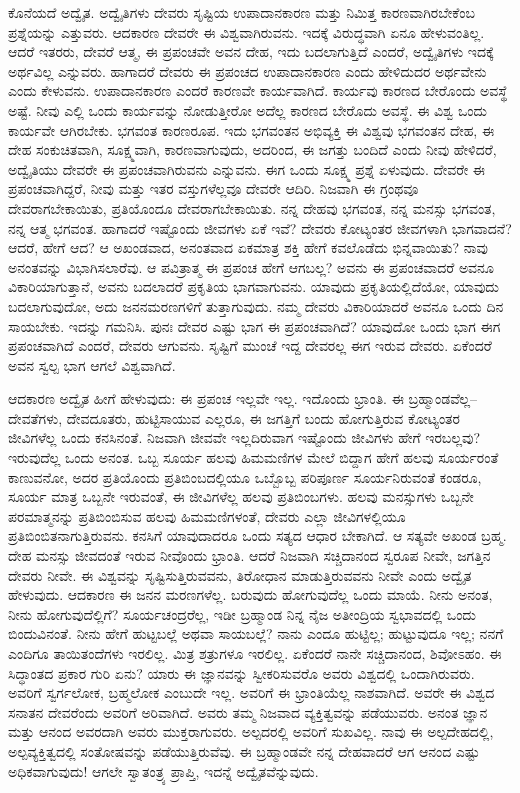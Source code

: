 ಕೊನೆಯದೆ ಅದ್ವೈತ. ಅದ್ವೈತಿಗಳು ದೇವರು ಸೃಷ್ಟಿಯ ಉಪಾದಾನಕಾರಣ ಮತ್ತು ನಿಮಿತ್ತ ಕಾರಣವಾಗಿರಬೇಕೆಂಬ ಪ್ರಶ್ನೆಯನ್ನು ಎತ್ತುವರು. ಆದಕಾರಣ ದೇವರೇ ಈ ವಿಶ್ವವಾಗಿರುವನು. ಇದಕ್ಕೆ ವಿರುದ್ಧವಾಗಿ ಏನೂ ಹೇಳುವಂತಿಲ್ಲ. ಆದರೆ ಇತರರು, ದೇವರೆ ಆತ್ಮ, ಈ ಪ್ರಪಂಚವೇ ಅವನ ದೇಹ, ಇದು ಬದಲಾಗುತ್ತಿದೆ ಎಂದರೆ, ಅದ್ವೈತಿಗಳು ಇದಕ್ಕೆ ಅರ್ಥವಿಲ್ಲ ಎನ್ನುವರು. ಹಾಗಾದರೆ ದೇವರು ಈ ಪ್ರಪಂಚದ ಉಪಾದಾನಕಾರಣ ಎಂದು ಹೇಳಿದುದರ ಅರ್ಥವೇನು ಎಂದು ಕೇಳುವನು. ಉಪಾದಾನಕಾರಣ ಎಂದರೆ ಕಾರಣವೇ ಕಾರ್ಯವಾಗಿದೆ. ಕಾರ್ಯವು ಕಾರಣದ ಬೇರೊಂದು ಅವಸ್ಥೆ ಅಷ್ಟೆ. ನೀವು ಎಲ್ಲಿ ಒಂದು ಕಾರ್ಯವನ್ನು ನೋಡುತ್ತೀರೋ ಅದೆಲ್ಲ ಕಾರಣದ ಬೇರೊದು ಅವಸ್ಥೆ. ಈ ವಿಶ್ವ ಒಂದು ಕಾರ್ಯವೇ ಆಗಿರಬೇಕು. ಭಗವಂತ ಕಾರಣರೂಪ. ಇದು ಭಗವಂತನ ಅಭಿವ್ಯಕ್ತಿ ಈ ವಿಶ್ವವು ಭಗವಂತನ ದೇಹ, ಈ ದೇಹ ಸಂಕುಚಿತವಾಗಿ, ಸೂಕ್ಷ್ಮವಾಗಿ, ಕಾರಣವಾಗುವುದು, ಅದರಿಂದ, ಈ ಜಗತ್ತು ಬಂದಿದೆ ಎಂದು ನೀವು ಹೇಳಿದರೆ, ಅದ್ವೈತಿಯು ದೇವರೇ ಈ ಪ್ರಪಂಚವಾಗಿರುವನು ಎನ್ನುವನು. ಈಗ ಒಂದು ಸೂಕ್ಷ್ಮ ಪ್ರಶ್ನೆ ಏಳುವುದು. ದೇವರೇ ಈ ಪ್ರಪಂಚವಾಗಿದ್ದರೆ, ನೀವು ಮತ್ತು ಇತರ ವಸ್ತುಗಳೆಲ್ಲವೂ ದೇವರೇ ಆದಿರಿ. ನಿಜವಾಗಿ ಈ ಗ್ರಂಥವೂ ದೇವರಾಗಬೇಕಾಯಿತು, ಪ್ರತಿಯೊಂದೂ ದೇವರಾಗಬೇಕಾಯಿತು. ನನ್ನ ದೇಹವು ಭಗವಂತ, ನನ್ನ ಮನಸ್ಸು ಭಗವಂತ, ನನ್ನ ಆತ್ಮ ಭಗವಂತ. ಹಾಗಾದರೆ ಇಷ್ಟೊಂದು ಜೀವಗಳು ಏಕೆ ಇವೆ? ದೇವರು ಕೋಟ್ಯಂತರ ಜೀವಗಳಾಗಿ ಭಾಗವಾದನೆ? ಆದರೆ, ಹೇಗೆ ಆದ? ಆ ಅಖಂಡವಾದ, ಅನಂತವಾದ ಏಕಮಾತ್ರ ಶಕ್ತಿ ಹೇಗೆ ಕವಲೊಡೆದು ಭಿನ್ನವಾಯಿತು? ನಾವು ಅನಂತವನ್ನು ವಿಭಾಗಿಸಲಾರೆವು. ಆ ಪವಿತ್ರಾತ್ಮ ಈ ಪ್ರಪಂಚ ಹೇಗೆ ಆಗಬಲ್ಲ? ಅವನು ಈ ಪ್ರಪಂಚವಾದರೆ ಅವನೂ ವಿಕಾರಿಯಾಗುತ್ತಾನೆ, ಅವನು ಬದಲಾದರೆ ಪ್ರಕೃತಿಯ ಭಾಗವಾಗುವನು. ಯಾವುದು ಪ್ರಕೃತಿಯಲ್ಲಿದೆಯೋ, ಯಾವುದು ಬದಲಾಗುವುದೋ, ಅದು ಜನನಮರಣಗಳಿಗೆ ತುತ್ತಾಗುವುದು. ನಮ್ಮ ದೇವರು ವಿಕಾರಿಯಾದರೆ ಅವನೂ ಒಂದು ದಿನ ಸಾಯಬೇಕು. ಇದನ್ನು ಗಮನಿಸಿ. ಪುನಃ ದೇವರ ಎಷ್ಟು ಭಾಗ ಈ ಪ್ರಪಂಚವಾಗಿದೆ? ಯಾವುದೋ ಒಂದು  ಭಾಗ ಈಗ ಪ್ರಪಂಚವಾಗಿದೆ ಎಂದರೆ, ದೇವರು  ಆಗುವನು. ಸೃಷ್ಟಿಗೆ ಮುಂಚೆ ಇದ್ದ ದೇವರಲ್ಲ ಈಗ ಇರುವ ದೇವರು. ಏಕೆಂದರೆ ಅವನ ಸ್ವಲ್ಪ ಭಾಗ ಆಗಲೆ ವಿಶ್ವವಾಗಿದೆ.

ಆದಕಾರಣ ಅದ್ವೈತ ಹೀಗೆ ಹೇಳುವುದು: ಈ ಪ್ರಪಂಚ ಇಲ್ಲವೇ ಇಲ್ಲ. ಇದೊಂದು ಭ್ರಾಂತಿ. ಈ ಬ್ರಹ್ಮಾಂಡವೆಲ್ಲ–ದೇವತೆಗಳು, ದೇವದೂತರು, ಹುಟ್ಟಿಸಾಯುವ ಎಲ್ಲರೂ, ಈ ಜಗತ್ತಿಗೆ ಬಂದು ಹೋಗುತ್ತಿರುವ ಕೋಟ್ಯಂತರ ಜೀವಿಗಳೆಲ್ಲ ಒಂದು ಕನಸಿನಂತೆ. ನಿಜವಾಗಿ ಜೀವವೇ ಇಲ್ಲದಿರುವಾಗ ಇಷ್ಟೊಂದು ಜೀವಿಗಳು ಹೇಗೆ ಇರಬಲ್ಲವು? ಇರುವುದೆಲ್ಲ ಒಂದು ಅನಂತ. ಒಬ್ಬ ಸೂರ್ಯ ಹಲವು ಹಿಮಮಣಿಗಳ ಮೇಲೆ ಬಿದ್ದಾಗ ಹೇಗೆ ಹಲವು ಸೂರ್ಯರಂತೆ ಕಾಣುವನೋ, ಅದರ ಪ್ರತಿಯೊಂದು ಪ್ರತಿಬಿಂಬದಲ್ಲಿಯೂ ಒಬ್ಬೊಬ್ಬ ಪರಿಪೂರ್ಣ ಸೂರ್ಯನಿರುವಂತೆ ಕಂಡರೂ, ಸೂರ್ಯ ಮಾತ್ರ ಒಬ್ಬನೇ ಇರುವಂತೆ, ಈ ಜೀವಿಗಳೆಲ್ಲ ಹಲವು ಪ್ರತಿಬಿಂಬಗಳು. ಹಲವು ಮನಸ್ಸುಗಳು ಒಬ್ಬನೇ ಪರಮಾತ್ಮನನ್ನು ಪ್ರತಿಬಿಂಬಿಸುವ ಹಲವು ಹಿಮಮಣಿಗಳಂತೆ, ದೇವರು ಎಲ್ಲಾ ಜೀವಿಗಳಲ್ಲಿಯೂ ಪ್ರತಿಬಿಂಬಿತನಾಗುತ್ತಿರುವನು. ಕನಸಿಗೆ ಯಾವುದಾದರೂ ಒಂದು ಸತ್ಯದ ಆಧಾರ ಬೇಕಾಗಿದೆ. ಆ ಸತ್ಯವೇ ಅಖಂಡ ಬ್ರಹ್ಮ. ದೇಹ ಮನಸ್ಸು ಜೀವದಂತೆ ಇರುವ ನೀವೊಂದು ಭ್ರಾಂತಿ. ಆದರೆ ನಿಜವಾಗಿ ಸಚ್ಚಿದಾನಂದ ಸ್ವರೂಪ ನೀವೇ, ಜಗತ್ತಿನ ದೇವರು ನೀವೇ. ಈ ವಿಶ್ವವನ್ನು ಸೃಷ್ಟಿಸುತ್ತಿರುವವನು, ತಿರೋಧಾನ ಮಾಡುತ್ತಿರುವವನು ನೀವೇ ಎಂದು ಅದ್ವೈತ ಹೇಳುವುದು. ಆದಕಾರಣ ಈ ಜನನ ಮರಣಗಳೆಲ್ಲ. ಬರುವುದು ಹೋಗುವುದೆಲ್ಲ ಒಂದು ಮಾಯೆ. ನೀನು ಅನಂತ, ನೀನು ಹೋಗುವುದೆಲ್ಲಿಗೆ? ಸೂರ್ಯಚಂದ್ರರೆಲ್ಲ, ಇಡೀ ಬ್ರಹ್ಮಾಂಡ ನಿನ್ನ ನೈಜ ಅತೀಂದ್ರಿಯ ಸ್ವಭಾವದಲ್ಲಿ ಒಂದು ಬಿಂದುವಿನಂತೆ. ನೀನು ಹೇಗೆ ಹುಟ್ಟಬಲ್ಲೆ ಅಥವಾ ಸಾಯಬಲ್ಲೆ? ನಾನು ಎಂದೂ ಹುಟ್ಟಿಲ್ಲ; ಹುಟ್ಟುವುದೂ ಇಲ್ಲ; ನನಗೆ ಎಂದಿಗೂ ತಾಯಿತಂದೆಗಳು ಇರಲಿಲ್ಲ. ಮಿತ್ರ ಶತ್ರುಗಳೂ ಇರಲಿಲ್ಲ. ಏಕೆಂದರೆ ನಾನೇ ಸಚ್ಚಿದಾನಂದ, ಶಿವೋಽಹಂ. ಈ ಸಿದ್ಧಾಂತದ ಪ್ರಕಾರ ಗುರಿ ಏನು? ಯಾರು ಈ ಜ್ಞಾನವನ್ನು ಸ್ವೀಕರಿಸುವರೊ ಅವರು ವಿಶ್ವದಲ್ಲಿ ಒಂದಾಗಿರುವರು. ಅವರಿಗೆ ಸ್ವರ್ಗಲೋಕ, ಬ್ರಹ್ಮಲೋಕ ಎಂಬುದೇ ಇಲ್ಲ. ಅವರಿಗೆ ಈ ಭ್ರಾಂತಿಯೆಲ್ಲ ನಾಶವಾಗಿದೆ. ಅವರೇ ಈ ವಿಶ್ವದ ಸನಾತನ ದೇವರೆಂದು ಅವರಿಗೆ ಅರಿವಾಗಿದೆ. ಅವರು ತಮ್ಮ ನಿಜವಾದ ವ್ಯಕ್ತಿತ್ವವನ್ನು ಪಡೆಯುವರು. ಅನಂತ ಜ್ಞಾನ ಮತ್ತು ಆನಂದ ಅವರದಾಗಿ ಅವರು ಮುಕ್ತರಾಗುವರು. ಅಲ್ಪದರಲ್ಲಿ ಅವರಿಗೆ ಸುಖವಿಲ್ಲ. ನಾವು ಈ ಅಲ್ಪದೇಹದಲ್ಲಿ, ಅಲ್ಪವ್ಯಕ್ತಿತ್ವದಲ್ಲಿ ಸಂತೋಷವನ್ನು ಪಡೆಯುತ್ತಿರುವೆವು. ಈ ಬ್ರಹ್ಮಾಂಡವೇ ನನ್ನ ದೇಹವಾದರೆ ಆಗ ಆನಂದ ಎಷ್ಟು ಅಧಿಕವಾಗುವುದು! ಆಗಲೇ ಸ್ವಾತಂತ್ರ್ಯ ಪ್ರಾಪ್ತಿ, ಇದನ್ನೆ ಅದ್ವೈತವೆನ್ನುವುದು.

